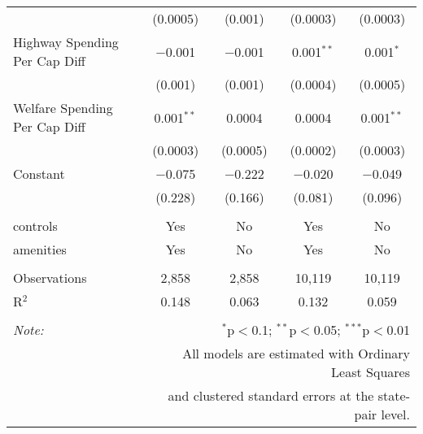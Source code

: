 \begin{table}[!htbp]
\begin{tabular}{@{\extracolsep{5pt}}lcccc}
  & (0.0005) & (0.001) & (0.0003) & (0.0003) \\ 
  Highway Spending Per Cap Diff & $-$0.001 & $-$0.001 & 0.001$^{**}$ & 0.001$^{*}$ \\ 
  & (0.001) & (0.001) & (0.0004) & (0.0005) \\ 
  Welfare Spending Per Cap Diff & 0.001$^{**}$ & 0.0004 & 0.0004 & 0.001$^{**}$ \\ 
  & (0.0003) & (0.0005) & (0.0002) & (0.0003) \\ 
  Constant & $-$0.075 & $-$0.222 & $-$0.020 & $-$0.049 \\ 
  & (0.228) & (0.166) & (0.081) & (0.096) \\ 
 \hline \\[-1.8ex] 
controls & Yes & No & Yes & No \\ 
amenities & Yes & No & Yes & No \\ 
\hline \\[-1.8ex] 
Observations & 2,858 & 2,858 & 10,119 & 10,119 \\ 
R$^{2}$ & 0.148 & 0.063 & 0.132 & 0.059 \\ 
\hline 
\hline \\[-1.8ex] 
\textit{Note:}  & \multicolumn{4}{r}{$^{*}$p$<$0.1; $^{**}$p$<$0.05; $^{***}$p$<$0.01} \\ 
 & \multicolumn{4}{r}{All models are estimated with Ordinary Least Squares} \\ 
 & \multicolumn{4}{r}{and clustered standard errors at the state-pair level.} \\ 
\end{tabular} 
\end{table} 
